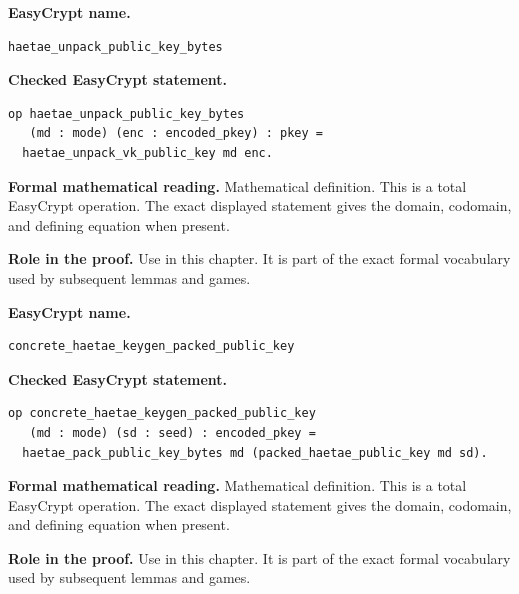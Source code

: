 \begin{formaldefinition}
\noindent\textbf{EasyCrypt name.}
\begin{lstlisting}[language=EasyCrypt,basicstyle=\ttfamily\scriptsize]
haetae_unpack_public_key_bytes
\end{lstlisting}
\noindent\textbf{Checked EasyCrypt statement.}
\begin{lstlisting}[language=EasyCrypt,basicstyle=\ttfamily\scriptsize]
op haetae_unpack_public_key_bytes
   (md : mode) (enc : encoded_pkey) : pkey =
  haetae_unpack_vk_public_key md enc.
\end{lstlisting}
\noindent\textbf{Formal mathematical reading.}
Mathematical definition. This is a total EasyCrypt operation.  The exact displayed statement gives the domain, codomain, and defining equation when present.

\noindent\textbf{Role in the proof.}
Use in this chapter. It is part of the exact formal vocabulary used by subsequent lemmas and games.

\end{formaldefinition}

\begin{formaldefinition}
\noindent\textbf{EasyCrypt name.}
\begin{lstlisting}[language=EasyCrypt,basicstyle=\ttfamily\scriptsize]
concrete_haetae_keygen_packed_public_key
\end{lstlisting}
\noindent\textbf{Checked EasyCrypt statement.}
\begin{lstlisting}[language=EasyCrypt,basicstyle=\ttfamily\scriptsize]
op concrete_haetae_keygen_packed_public_key
   (md : mode) (sd : seed) : encoded_pkey =
  haetae_pack_public_key_bytes md (packed_haetae_public_key md sd).
\end{lstlisting}
\noindent\textbf{Formal mathematical reading.}
Mathematical definition. This is a total EasyCrypt operation.  The exact displayed statement gives the domain, codomain, and defining equation when present.

\noindent\textbf{Role in the proof.}
Use in this chapter. It is part of the exact formal vocabulary used by subsequent lemmas and games.

\end{formaldefinition}

